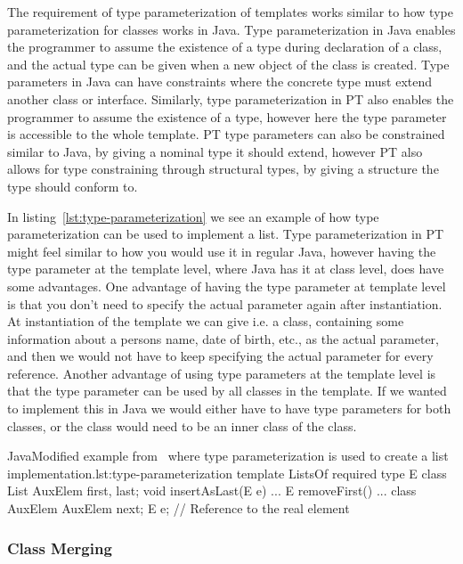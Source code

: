 The requirement of type parameterization of templates works similar to how type parameterization for classes works in Java.
Type parameterization in Java enables the programmer to assume the existence of a type during declaration of a class, and the actual type can be given when a new object of the class is created.
Type parameters in Java can have constraints where the concrete type must extend another class or interface.
Similarly, type parameterization in PT also enables the programmer to assume the existence of a type, however here the type parameter is accessible to the whole template.
PT type parameters can also be constrained similar to Java, by giving a nominal type it should extend, however PT also allows for type constraining through structural types, by giving a structure the type should conform to.

In listing~\vref{lst:type-parameterization} we see an example of how type parameterization can be used to implement a list.
Type parameterization in PT might feel similar to how you would use it in regular Java, however having the type parameter at the template level, where Java has it at class level, does have some advantages.
One advantage of having the type parameter at template level is that you don't need to specify the actual parameter again after instantiation.
At instantiation of the  template we can give i.e. a  class, containing some information about a persons name, date of birth, etc., as the actual parameter, and then we would not have to keep specifying the actual parameter for every reference.
Another advantage of using type parameters at the template level is that the type parameter can be used by all classes in the template.
If we wanted to implement this in Java we would either have to have type parameters for both classes, or the  class would need to be an inner class of the  class.

\begin{code}{Java}{Modified example from~\cite{jot} where type parameterization is used to create a list implementation.}{lst:type-parameterization}
    template ListsOf {
        required type E { }
        class List {
            AuxElem first, last;
            void insertAsLast(E e) { ... }
            E removeFirst() { ... }
        }
        class AuxElem {
            AuxElem next;
            E e; // Reference to the real element
        }
    }
\end{code}

\subsubsection{Class Merging}\label{subsubsec:class-merging}

